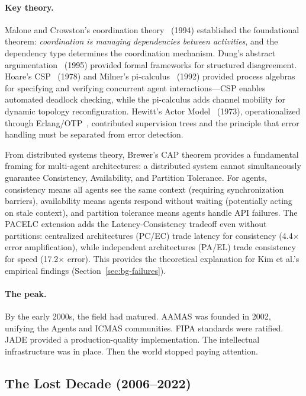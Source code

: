 \documentclass{article}
\begin{document}
\paragraph{Key theory.}
Malone and Crowston's coordination theory~\citep{malone1994interdisciplinary} (1994)
established the foundational theorem: \emph{coordination is managing dependencies between
activities}, and the dependency type determines the coordination mechanism. Dung's
abstract argumentation~\citep{dung1995acceptability} (1995) provided formal frameworks
for structured disagreement. Hoare's CSP~\citep{hoare1978communicating} (1978) and
Milner's pi-calculus~\citep{milner1992calculus} (1992) provided process algebras for
specifying and verifying concurrent agent interactions---CSP enables automated deadlock
checking, while the pi-calculus adds channel mobility for dynamic topology
reconfiguration. Hewitt's Actor Model~\citep{hewitt1973actor} (1973), operationalized
through Erlang/OTP~\citep{armstrong2003erlang}, contributed supervision trees and the
principle that error handling must be separated from error detection.

From distributed systems theory, Brewer's CAP theorem provides a fundamental framing for
multi-agent architectures: a distributed system cannot simultaneously guarantee
Consistency, Availability, and Partition Tolerance. For agents, consistency means all
agents see the same context (requiring synchronization barriers), availability means
agents respond without waiting (potentially acting on stale context), and partition
tolerance means agents handle API failures. The PACELC extension adds the
Latency-Consistency tradeoff even without partitions: centralized architectures (PC/EC)
trade latency for consistency (4.4$\times$ error amplification), while independent
architectures (PA/EL) trade consistency for speed (17.2$\times$ error). This provides
the theoretical explanation for Kim et al.'s empirical findings
(Section~\ref{sec:bg-failures}).

\paragraph{The peak.}
By the early 2000s, the field had matured. AAMAS was founded in 2002, unifying
the Agents and ICMAS communities. FIPA standards were ratified. JADE provided a
production-quality implementation. The intellectual infrastructure was in place. Then the
world stopped paying attention.

\subsection{The Lost Decade (2006--2022)}
\label{sec:bg-lost}
\end{document}

